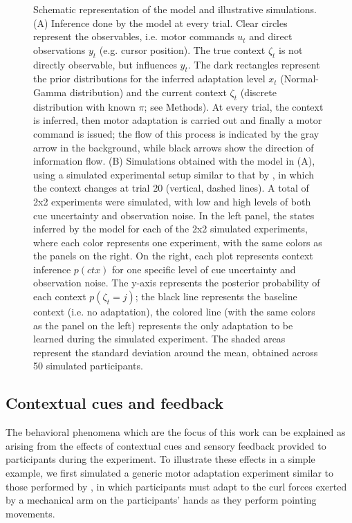 \documentclass[a4paper,doc,floatsintext,natbib]{apa6}
\begin{document}
\begin{figure}
\caption{Schematic representation of the model and illustrative simulations. (A) Inference done by the model at every trial. Clear circles represent the observables, i.e. motor commands $u_t$ and direct observations $y_t$ (e.g. cursor position). The true context $\zeta_t$ is not directly observable, but influences $y_t$. The dark rectangles represent the prior distributions for the inferred adaptation level $x_t$ (Normal-Gamma distribution) and the current context $\zeta_t$ (discrete distribution with known $\pi$; see Methods). At every trial, the context is inferred, then motor adaptation is carried out and finally a motor command is issued; the flow of this process is indicated by the gray arrow in the background, while black arrows show the direction of information flow. (B) Simulations obtained with the model in (A), using a simulated experimental setup similar to that by \cite{Davidson_Scaling_2004}, in which the context changes at trial 20 (vertical, dashed lines). A total of 2x2 experiments were simulated, with low and high levels of both cue uncertainty and observation noise. In the left panel, the states inferred by the model for each of the 2x2 simulated experiments, where each color represents one experiment, with the same colors as the panels on the right. On the right, each plot represents context inference $p(ctx)$ for one specific level of cue uncertainty and observation noise. The y-axis represents the posterior probability of each context $p(\zeta_t = j)$; the black line represents the baseline context (i.e. no adaptation), the colored line (with the same colors as the panel on the left) represents the only adaptation to be learned during the simulated experiment. The shaded areas represent the standard deviation around the mean, obtained across 50 simulated participants.}
\label{fig:model}
\end{figure}

\subsection{Contextual cues and feedback}
The behavioral phenomena which are the focus of this work can be explained as arising from the effects of contextual cues and sensory feedback provided to participants during the experiment. To illustrate these effects in a simple example, we first simulated a generic motor adaptation experiment similar to those performed by \cite{Davidson_Scaling_2004}, in which participants must adapt to the curl forces exerted by a mechanical arm on the participants' hands as they perform pointing movements.
\end{document}

